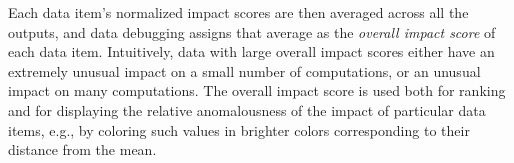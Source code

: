 Each data item's normalized impact scores are then averaged across
all the outputs, and data debugging assigns that average as the
\emph{overall impact score} of each data item. Intuitively, data with
large overall impact scores either have an extremely unusual impact on a
small number of computations, or an unusual impact on many
computations. The overall impact score is used both for ranking and
for displaying the relative anomalousness of the impact of particular
data items, e.g., by coloring such values in brighter colors
corresponding to their distance from the mean.



